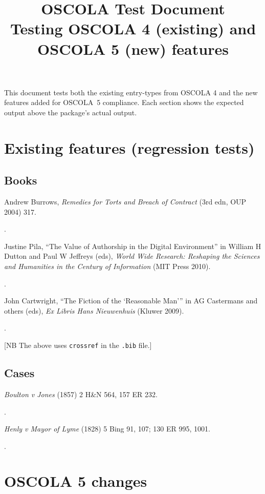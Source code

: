 \documentclass[12pt]{article}
\title{OSCOLA Test Document\\
  \large Testing OSCOLA 4 (existing) and OSCOLA 5 (new) features}
\author{}
\newcommand{\model}{%
  \par\strut\llap{*~}}
\begin{document}
\maketitle

This document tests both the existing entry-types from OSCOLA 4 and
the new features added for OSCOLA~5 compliance.  Each section shows
the expected output above the package's actual output.

\section{Existing features (regression tests)}

\subsection{Books}

\model Andrew Burrows, \emph{Remedies for Torts and Breach of
  Contract} (3rd edn, OUP 2004) 317.

\cite[317]{burrows04}.

\model Justine Pila, \enquote{The Value of Authorship in the Digital
  Environment} in William H Dutton and Paul W Jeffreys (eds),
\emph{World Wide Research: Reshaping the Sciences and Humanities in
  the Century of Information} (MIT Press 2010).

\cite{pila10}.

\model John Cartwright, \enquote{The Fiction of the
  \enquote{Reasonable Man}} in AG Castermans and others (eds),
\emph{Ex Libris Hans Nieuwenhuis} (Kluwer 2009).

\cite{cartwright09}.

[NB The above uses \texttt{crossref} in the \texttt{.bib} file.]

\subsection{Cases}

\model \emph{Boulton v Jones} (1857) 2 H\&N 564, 157 ER 232.

\cite{boulton57}.

\model \emph{Henly v Mayor of Lyme} (1828) 5 Bing 91, 107; 130 ER 995,
1001.

\cite[107|1001]{henly28}.

\section{OSCOLA 5 changes}
\end{document}
